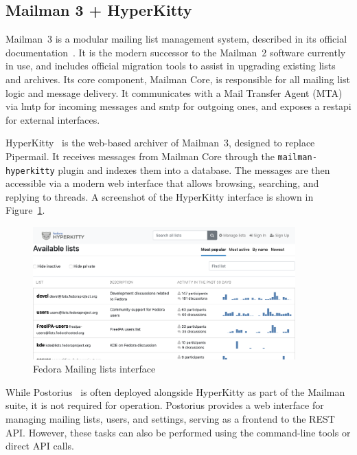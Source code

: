 \subsection*{Mailman 3 + HyperKitty}

Mailman~3 is a modular mailing list management system, described in its official documentation~\cite{mailman-install-docs}. It is the modern successor to the Mailman~2 software currently in use, and includes official migration tools to assist in upgrading existing lists and archives. Its core component, Mailman Core, is responsible for all mailing list logic and message delivery. It communicates with a Mail Transfer Agent (MTA) via \gls{lmtp} for incoming messages and \gls{smtp} for outgoing ones, and exposes a \gls{restapi} for external interfaces.

HyperKitty~\cite{hyperkitty-docs} is the web-based archiver of Mailman~3, designed to replace Pipermail. It receives messages from Mailman Core through the \texttt{mailman-hyperkitty} plugin and indexes them into a database. The messages are then accessible via a modern web interface that allows browsing, searching, and replying to threads. A screenshot of the HyperKitty interface is shown in Figure~\ref{fig:fedora-hyperkitty}.

\begin{figure}[H]
  \centering
  \includegraphics[width=0.9\textwidth]{imaxes/fedora-hyperkitty.png}
  \caption{Fedora Mailing lists interface}
  \label{fig:fedora-hyperkitty}
\end{figure}

While Postorius~\cite{postorius-docs} is often deployed alongside HyperKitty as part of the Mailman suite, it is not required for operation. Postorius provides a web interface for managing mailing lists, users, and settings, serving as a frontend to the REST API. However, these tasks can also be performed using the command-line tools or direct API calls.

